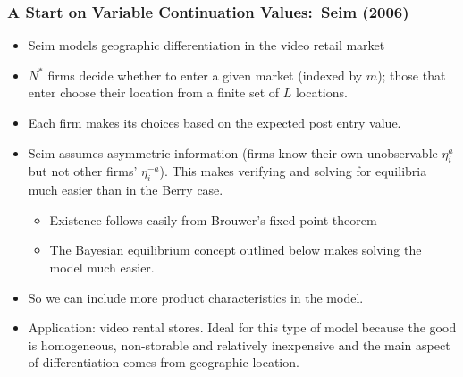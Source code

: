 \begin{frame}%

\frametitle{A Start on Variable Continuation Values:\ Seim (2006)}

\begin{itemize}
\item Seim models geographic differentiation in the video retail market

\item $N^{\ast }$ firms decide whether to enter a given market (indexed by $%
m $); those that enter choose their location from a finite set of $L$
locations.

\item Each firm makes its choices based on the expected post entry value.

\item Seim assumes asymmetric information (firms know their own unobservable 
$\eta _{i}^{a}$ but not other firms' $\eta _{i}^{-a}$). This makes verifying
and solving for equilibria much easier than in the Berry case.

\begin{itemize}
\item Existence follows easily from Brouwer's fixed point theorem

\item The Bayesian equilibrium concept outlined below makes solving the
model much easier.
\end{itemize}

\item So we can include more product characteristics in the model.

\item Application: video rental stores. Ideal for this type of model because
the good is homogeneous, non-storable and relatively inexpensive and the
main aspect of differentiation comes from geographic location.
\end{itemize}

\end{frame}%

